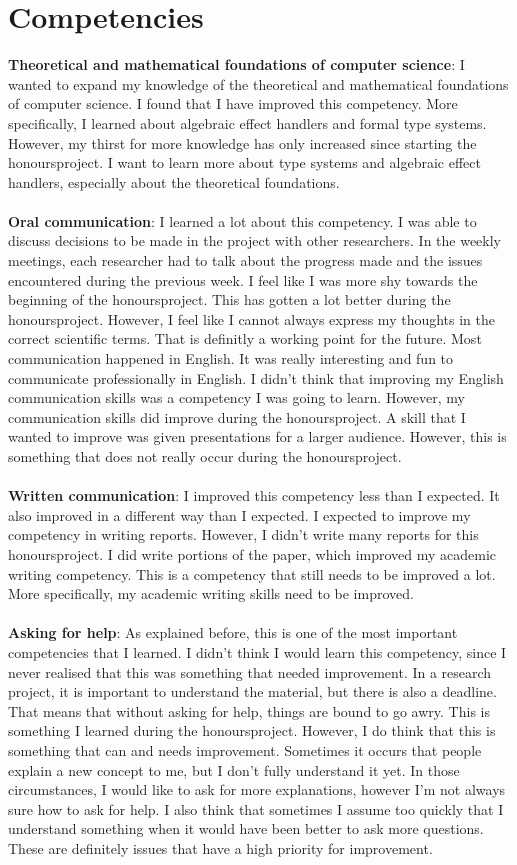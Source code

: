 \section{Competencies}
\textbf{Theoretical and mathematical foundations of computer science}: I wanted to expand my knowledge of the theoretical and mathematical foundations of computer science. I found that I have improved this competency. More specifically, I learned about algebraic effect handlers and formal type systems. However, my thirst for more knowledge has only increased since starting the honoursproject. I want to learn more about type systems and algebraic effect handlers, especially about the theoretical foundations. \\
\\
\textbf{Oral communication}: I learned a lot about this competency. I was able to discuss decisions to be made in the project with other researchers. In the weekly meetings, each researcher had to talk about the progress made and the issues encountered during the previous week. I feel like I was more shy towards the beginning of the honoursproject. This has gotten a lot better during the honoursproject. However, I feel like I cannot always express my thoughts in the correct scientific terms. That is definitly a working point for the future. Most communication happened in English. It was really interesting and fun to communicate professionally in English. I didn't think that improving my English communication skills was a competency I was going to learn. However, my communication skills did improve during the honoursproject. A skill that I wanted to improve was given presentations for a larger audience. However, this is something that does not really occur during the honoursproject. \\
\\
\textbf{Written communication}: I improved this competency less than I expected. It also improved in a different way than I expected. I expected to improve my competency in writing reports. However, I didn't write many reports for this honoursproject. I did write portions of the paper, which improved my academic writing competency. This is a competency that still needs to be improved a lot. More specifically, my academic writing skills need to be improved. \\
\\
\textbf{Asking for help}: As explained before, this is one of the most important competencies that I learned. I didn't think I would learn this competency, since I never realised that this was something that needed improvement. In a research project, it is important to understand the material, but there is also a deadline. That means that without asking for help, things are bound to go awry.  This is something I learned during the honoursproject. However, I do think that this is something that can and needs improvement. Sometimes it occurs that people explain a new concept to me, but I don't fully understand it yet. In those circumstances, I would like to ask for more explanations, however I'm not always sure how to ask for help. I also think that sometimes I assume too quickly that I understand something when it would have been better to ask more questions. These are definitely issues that have a high priority for improvement.\\
